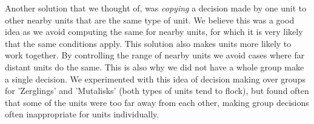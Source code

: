 Another solution that we thought of, was \emph{copying} a decision made by one unit to other nearby units that are the same type of unit. We believe this was a good idea as we avoid computing the same for nearby units, for which it is very likely that the same conditions apply. This solution also makes units more likely to work together. By controlling the range of nearby units we avoid cases where far distant units do the same. This is also why we did not have a whole group make a single decision. We experimented with this idea of decision making over groups for 'Zerglings' and 'Mutalisks' (both types of units tend to flock), but found often that some of the units were too far away from each other, making group decisions often inappropriate for units individually.










